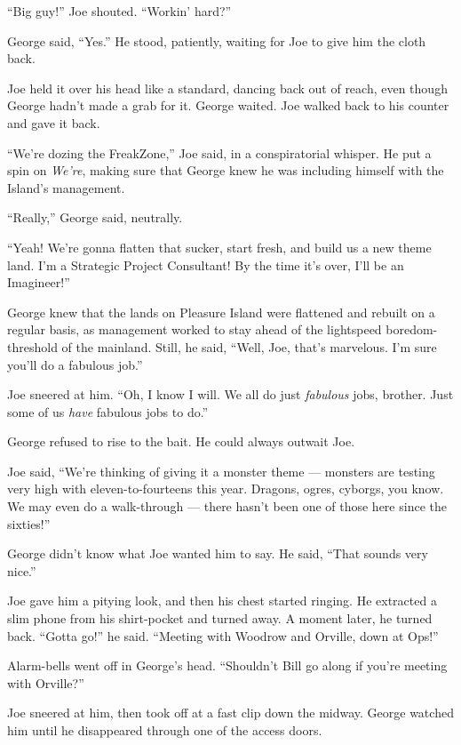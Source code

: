 ``Big guy!'' Joe shouted. ``Workin' hard?''

George said, ``Yes.'' He stood, patiently, waiting for Joe to give
him the cloth back.

Joe held it over his head like a standard, dancing back out of
reach, even though George hadn't made a grab for it. George waited.
Joe walked back to his counter and gave it back.

``We're dozing the FreakZone,'' Joe said, in a conspiratorial
whisper. He put a spin on \emph{We're}, making sure that George
knew he was including himself with the Island's management.

``Really,'' George said, neutrally.

``Yeah! We're gonna flatten that sucker, start fresh, and build us a new theme 
land. I'm a Strategic Project Consultant! By the time it's over, I'll be an 
Imagineer!''

George knew that the lands on Pleasure Island were flattened and
rebuilt on a regular basis, as management worked to stay ahead of
the lightspeed boredom-threshold of the mainland. Still, he said,
``Well, Joe, that's marvelous. I'm sure you'll do a fabulous job.''

Joe sneered at him.
``Oh, I know I will. We all do just \emph{fabulous} jobs, brother. Just some of 
us \emph{have} fabulous jobs to do.''

George refused to rise to the bait. He could always outwait Joe.

Joe said,
``We're thinking of giving it a monster theme --- monsters are testing very 
high with eleven-to-fourteens this year. Dragons, ogres, cyborgs, you know. We 
may even do a walk-through --- there hasn't been one of those here since the 
sixties!''

George didn't know what Joe wanted him to say. He said,
``That sounds very nice.''

Joe gave him a pitying look, and then his chest started ringing. He
extracted a slim phone from his shirt-pocket and turned away. A
moment later, he turned back. ``Gotta go!'' he said.
``Meeting with Woodrow and Orville, down at Ops!''

Alarm-bells went off in George's head.
``Shouldn't Bill go along if you're meeting with Orville?''

Joe sneered at him, then took off at a fast clip down the midway.
George watched him until he disappeared through one of the access
doors.

\tb

